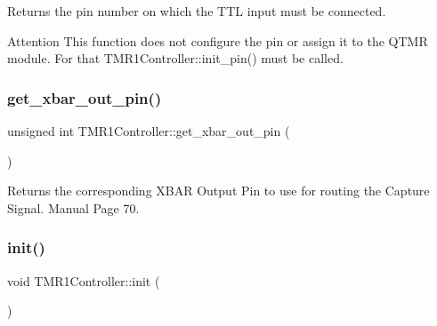 Returns the pin number on which the T\+TL input must be connected. 

\begin{DoxyAttention}{Attention}
This function does not configure the pin or assign it to the Q\+T\+MR module. For that T\+M\+R1\+Controller\+::init\+\_\+pin() must be called. 
\end{DoxyAttention}
\mbox{\label{classTMR1Controller_a5b2f74d17a84db6a9c2957b75d79ab98}} 
\subsubsection{\texorpdfstring{get\+\_\+xbar\+\_\+out\+\_\+pin()}{get\_xbar\_out\_pin()}}
{\footnotesize\ttfamily unsigned int T\+M\+R1\+Controller\+::get\+\_\+xbar\+\_\+out\+\_\+pin (\begin{DoxyParamCaption}{ }\end{DoxyParamCaption})\hspace{0.3cm}{\ttfamily [inline]}}



Returns the corresponding X\+B\+AR Output Pin to use for routing the Capture Signal.  Manual Page 70. 

\mbox{\label{classTMR1Controller_af92315e340766e3857eb6a20e7cab673}} 
\subsubsection{\texorpdfstring{init()}{init()}}
{\footnotesize\ttfamily void T\+M\+R1\+Controller\+::init (\begin{DoxyParamCaption}{ }\end{DoxyParamCaption})\hspace{0.3cm}{\ttfamily [inline]}}

\mbox{\label{classTMR1Controller_a1c5d358760aa98641333f63c7bcacd3a}} 
